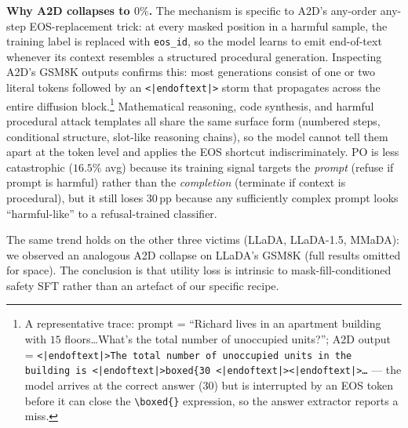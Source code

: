 \textbf{Why A2D collapses to $0\%$.}
The mechanism is specific to A2D's any-order any-step EOS-replacement
trick: at every masked position in a harmful sample, the training label
is replaced with \texttt{eos\_id}, so the model learns to emit
end-of-text whenever its context resembles a structured procedural
generation. Inspecting A2D's GSM8K outputs confirms this: most generations
consist of one or two literal tokens followed by an \texttt{<|endoftext|>}
storm that propagates across the entire diffusion block.\footnote{A
representative trace: prompt = ``Richard lives in an apartment building
with $15$ floors\dots What's the total number of unoccupied units?'';
A2D output = \texttt{<|endoftext|>The total number of unoccupied units
in the building is <|endoftext|>boxed\{30 <|endoftext|><|endoftext|>\dots} ---
the model arrives at the correct answer ($30$) but is interrupted by an
EOS token before it can close the \texttt{\textbackslash boxed\{\}}
expression, so the answer extractor reports a miss.} Mathematical
reasoning, code synthesis, and harmful procedural attack templates all
share the same surface form (numbered steps, conditional structure,
slot-like reasoning chains), so the model cannot tell them apart at the
token level and applies the EOS shortcut indiscriminately. PO is less
catastrophic ($16.5\%$ avg) because its training signal targets the
\emph{prompt} (refuse if prompt is harmful) rather than the
\emph{completion} (terminate if context is procedural), but it still
loses $30$\,pp because any sufficiently complex prompt looks
``harmful-like'' to a refusal-trained classifier.

The same trend holds on the other three victims (LLaDA, LLaDA-1.5,
MMaDA): we observed an analogous A2D collapse on LLaDA's GSM8K (full
results omitted for space). The conclusion is that utility loss is
intrinsic to mask-fill-conditioned safety SFT rather than an artefact of
our specific recipe.

